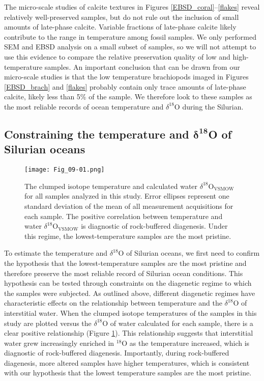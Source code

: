 \documentclass[5p, authoryear]{elsarticle}
\begin{document}
The micro-scale studies of calcite textures in Figures \ref{EBSD_coral}--\ref{flakes} reveal relatively well-preserved samples, but do not rule out the inclusion of small amounts of late-phase calcite. Variable fractions of late-phase calcite likely contribute to the range in temperature among fossil samples. We only performed SEM and EBSD analysis on a small subset of samples, so we will not attempt to use this evidence to compare the relative preservation quality of low and high-temperature samples. An important conclusion that can be drawn from our micro-scale studies is that the low temperature brachiopods imaged in Figures \ref{EBSD_brach} and \ref{flakes} probably contain only trace amounts of late-phase calcite, likely less than 5\% of the sample. We therefore look to these samples as the most reliable records of ocean temperature and $\delta^{18}$O during the Silurian. 

\subsection{Constraining the temperature and $\mathbf{\delta^{18}}$O of Silurian oceans} 

\begin{figure}[b]
\centering
\texttt{[image: Fig\_09-01.png]}
\caption{The clumped isotope temperature and calculated water $\delta^{18}$O$_{\text{VSMOW}}$ for all samples analyzed in this study. Error ellipses represent one standard deviation of the mean of all measurement acquisitions for each sample. The positive correlation between temperature and water $\delta^{18}$O$_{\text{VSMOW}}$ is diagnostic of rock-buffered diagenesis. Under this regime, the lowest-temperature samples are the most pristine.}
\label{ellipses}
\end{figure}

To estimate the temperature and $\delta^{18}$O of Silurian oceans, we first need to confirm the hypothesis that the lowest-temperature samples are the most pristine and therefore preserve the most reliable record of Silurian ocean conditions. This hypothesis can be tested through constraints on the diagenetic regime to which the samples were subjected. As outlined above, different diagenetic regimes have characteristic effects on the relationship between temperature and the $\delta^{18}$O of interstitial water. When the clumped isotope temperatures of the samples in this study are plotted versus the $\delta^{18}$O of water calculated for each sample, there is a clear positive relationship (Figure \ref{ellipses}). This relationship suggests that interstitial water grew increasingly enriched in $^{18}$O as the temperature increased, which is diagnostic of rock-buffered diagenesis. Importantly, during rock-buffered diagenesis, more altered samples have higher temperatures, which is consistent with our hypothesis that the lowest temperature samples are the most pristine.
\end{document}
